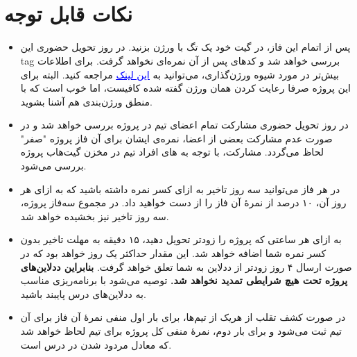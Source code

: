 \documentclass[]{article}
\begin{document}
\newpage
\pagestyle{fancy}
\fancyhf{}
\fancyfoot{}
\cfoot{\thepage}
\renewcommand{\headrulewidth}{2pt}

\KashidaOff



\tableofcontents

\newpage

 \Large \textbf{\\\\
}


\section*{{\titr نکات قابل توجه}}
\begin{itemize}
\item
پس از اتمام این فاز، در گیت خود یک تگ با ورژن  بزنید. در روز تحویل حضوری این tag بررسی خواهد شد و کدهای پس از آن نمره‌ای نخواهد گرفت. برای اطلاعات بیش‌تر در مورد شیوه ورژن‌گذاری، می‌توانید به
 \href{https://semver.org/}{\textcolor{blue}{\underline{این لینک}}}
 مراجعه کنید. البته برای این پروژه صرفا رعایت کردن همان ورژن گفته شده کافیست، اما خوب‌ است که با منطق ورژن‌بندی هم آشنا بشوید.

\item
در روز تحویل حضوری مشارکت تمام اعضای تیم در پروژه بررسی خواهد‌ شد و در صورت عدم مشارکت بعضی از اعضا، نمره‌ی ایشان برای آن فاز پروژه "صفر" لحاظ می‌گردد. مشارکت، با توجه به  های افراد تیم در مخزن گیت‌هاب پروژه بررسی می‌شود.

\item
در هر فاز می‌توانید سه روز تاخیر به ازای کسر نمره داشته‌ باشید که به ازای هر روز آن، ۱۰ درصد از نمرهٔ آن فاز را از دست خواهید‌ داد. در مجموع سه‌فاز پروژه، سه روز تاخیر نیز بخشیده خواهد‌ شد.

\item
به ازای هر ساعتی که پروژه را زودتر تحویل دهید، ۱۵ دقیقه به مهلت تاخیر بدون کسر نمره شما اضافه خواهد‌ شد. این مقدار حداکثر یک روز خواهد‌ بود که در صورت ارسال ۴ روز زودتر از ددلاین به شما تعلق خواهد گرفت. \textbf{بنابراین ددلاین‌های پروژه تحت هیچ شرایطی تمدید نخواهد‌ شد.} توصیه می‌شود با برنامه‌ریزی مناسب به ددلاین‌های درس پایبند باشید.

\item
در صورت کشف تقلب از هریک از تیم‌ها، برای بار اول منفی نمرهٔ آن فاز برای آن تیم ثبت می‌شود و برای بار دوم، نمرهٔ منفی کل پروژه برای تیم لحاظ خواهد‌ شد که معادل مردود شدن در درس است.
\end{itemize}
\newpage
\end{document}
